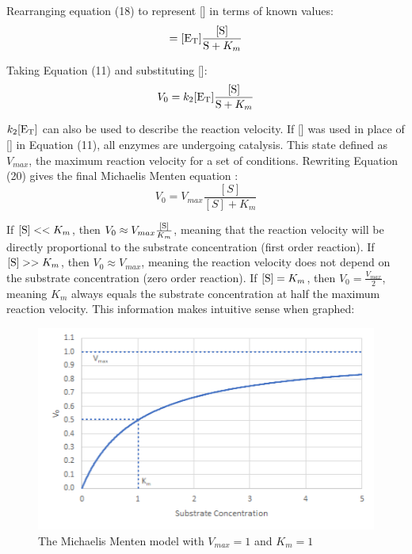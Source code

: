 \documentclass{article}
\begin{document}
Rearranging equation (18) to represent [] in terms of known values:
\begin{equation}
    [\ce{ES}] = [\ce{E_T}]\frac{[\ce{S}]}{\ce{S} + K_m}
\end{equation}

Taking Equation (11) and substituting []:
\begin{equation}
    V_0 = k_2[\ce{E_T}]\frac{[\ce{S}]}{\ce{S} + K_m}
\end{equation}

$k_2[\ce{E_T}]$ can also be used to describe the reaction velocity. If [] was used in place of [] in Equation (11), all enzymes are undergoing catalysis. This state defined as $V_{max}$, the maximum reaction velocity for a set of conditions. Rewriting Equation (20) gives the final Michaelis Menten equation \parencite{biochem}:
\begin{equation}
    V_0 = V_{max}\frac{[S]}{[S] + K_m}
\end{equation}

If $[\ce{S}] << K_m$, then $V_0 \approx V_{max}\frac{[\ce{S}]}{K_m}$, meaning that the reaction velocity will be directly proportional to the substrate concentration (first order reaction). If $[\ce{S}] >> K_m$, then $V_0 \approx V_{max}$, meaning the reaction velocity does not depend on the substrate concentration (zero order reaction). If $[\ce{S}] = K_m$, then $V_0 = \frac{V_{max}}{2}$, meaning $K_m$ always equals the substrate concentration at half the maximum reaction velocity. This information makes intuitive sense when graphed:
\begin{figure}[H]
    \renewcommand{\figurename}{Graph}
    \setcounter{figure}{0}
    \centering
    \includegraphics{figures/graph_01.png}
    \vspace*{-12pt}
    \caption{The Michaelis Menten model with $V_{max} = 1$ and $K_m = 1$}
    \label{fig:graph1}
\end{figure}
\end{document}
